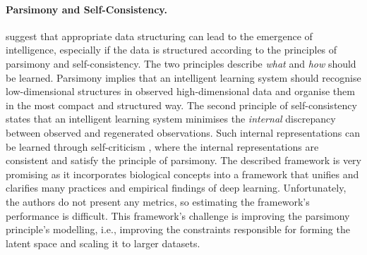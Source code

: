 \paragraph{Parsimony and Self-Consistency.}  suggest that appropriate data structuring can lead to the emergence of intelligence, especially if the data is structured according to the principles of parsimony and self-consistency. The two principles describe \emph{what} and \emph{how} should be learned. Parsimony implies that an intelligent learning system should recognise low-dimensional structures in observed high-dimensional data and organise them in the most compact and structured way. The second principle of self-consistency states that an intelligent learning system minimises the \emph{internal} discrepancy between observed and regenerated observations. Such internal representations can be learned through self-criticism , where the internal representations are consistent and satisfy the principle of parsimony. The described framework is very promising as it incorporates biological concepts into a framework that unifies and clarifies many practices and empirical findings of deep learning.
Unfortunately, the authors do not present any metrics, so estimating the framework's performance is difficult.
This framework's challenge is improving the parsimony principle's modelling, i.e., improving the constraints responsible for forming the latent space and scaling it to larger datasets.

